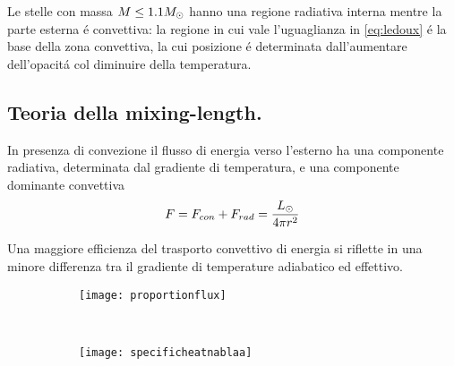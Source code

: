 \documentclass[../main.tex]{subfiles}
\begin{document}
Le stelle con massa $M\leq1.1M_{\odot}{}$ hanno una regione radiativa interna mentre la parte esterna \'e convettiva: la regione in cui vale l'uguaglianza in \eqref{eq:ledoux} \'e la base della zona convettiva, la cui posizione \'e determinata dall'aumentare dell'opacit\'a col diminuire della temperatura.

\begin{workout}

\end{workout}

\subsection{Teoria della mixing-length.}

In presenza di convezione il flusso di energia verso l'esterno ha una componente radiativa, determinata dal gradiente di temperatura, e una componente dominante convettiva 
\begin{equation}\label{eq:radconvflux}
F=F_{con}+F_{rad}=\frac{L_{\odot}{}}{4\pi r^2}
\end{equation}

Una maggiore efficienza del trasporto convettivo di energia si riflette in una minore differenza tra il gradiente di temperature adiabatico ed effettivo.

\begin{figure}[!h]
\begin{subfigure}[b]{0.55\textwidth}
    \texttt{[image: proportionflux]}
    \label{fluxproportion}
\end{subfigure}
~
\begin{subfigure}[b]{0.4\textwidth}
\centering
\texttt{[image: specificheatnablaa]}
\end{subfigure}
\end{figure}
\end{document}
